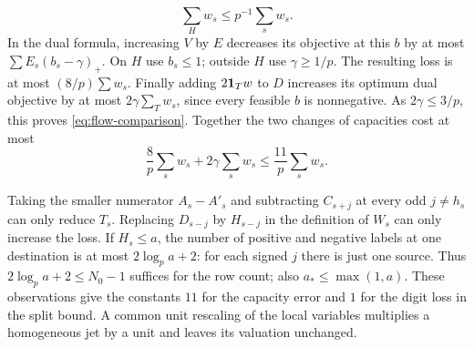\[
  \sum_H w_s\le p^{-1}\sum_s w_s.
\]
 In the dual formula,
increasing \(V\) by \(E\) decreases its objective at this \(b\)
by at most \(\sum E_s(b_s-\gamma)_+\). On \(H\) use \(b_s\le1\);
outside \(H\) use \(\gamma\ge1/p\). The resulting loss is at
most \((8/p)\sum w_s\). Finally adding \(2{\bf1}_T w\) to
\(D\) increases its optimum dual objective by at most
\(2\gamma\sum_T w_s\), since every feasible \(b\) is
nonnegative. As \(2\gamma\le3/p\), this proves
\eqref{eq:flow-comparison}.
Together the two changes of capacities cost at most
\[
  \frac8p\sum_s w_s+2\gamma\sum_s w_s\le\frac{11}{p}\sum_s w_s.
\]

Taking the smaller numerator \(A_s-A'_s\) and subtracting
\(C_{s+j}\) at every odd \(j\ne h_s\) can only reduce \(T_s\).
Replacing \(D_{s-j}\) by \(H_{s-j}\) in the definition of \(W_s\)
can only increase the loss. If \(H_s\le a\), the number of
positive and negative labels at one destination is at most
\(2\log_p a+2\): for each signed \(j\) there is just one source.
Thus \(2\log_p a+2\le N_0-1\) suffices for the row count; also
\(a_*\le\max(1,a)\). These observations give the constants
\(11\) for the capacity error and \(1\) for the digit loss in
the split bound. A common unit rescaling of the local variables
multiplies a homogeneous jet by a unit and leaves its valuation
unchanged.  \label{cor:cyclic-jets-1}
